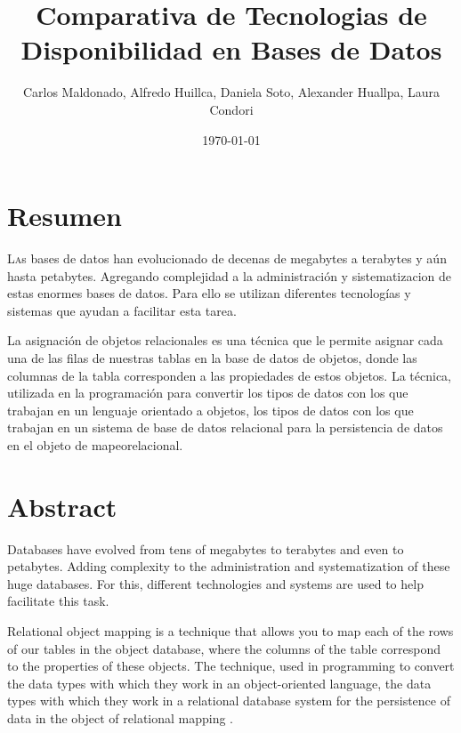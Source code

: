 \documentclass[twoside,twocolumn]{article}
\title{Comparativa de Tecnologias de Disponibilidad en Bases de Datos} %
\author{Carlos Maldonado, Alfredo Huillca, Daniela Soto, Alexander Huallpa, Laura Condori}
\date{\today} %
\begin{document}
\maketitle


\section{Resumen}

\lettrine[nindent=0em,lines=3] Las bases de 
datos han evolucionado de decenas de megabytes a
 terabytes y aún hasta petabytes. Agregando complejidad
  a la administración y sistematizacion de estas enormes 
  bases de datos. Para ello se utilizan diferentes tecnologías 
  y sistemas que ayudan a facilitar esta tarea. 

La asignación de objetos relacionales es una técnica que le 
permite asignar cada una de las filas de nuestras tablas en la
 base de datos de objetos, donde las columnas de la tabla corresponden 
 a las propiedades de estos objetos. La técnica, utilizada en la
  programación para convertir los tipos de datos con los que trabajan
   en un lenguaje orientado a objetos, los tipos de datos con los que 
   trabajan en un sistema de base de datos relacional para la persistencia
    de datos en el objeto de mapeorelacional. 




\section{Abstract}


Databases have evolved from tens of megabytes to 
terabytes and even to petabytes. Adding complexity to 
the administration and systematization of these huge databases.
 For this, different technologies and systems are used to help 
 facilitate this task.

Relational object mapping is a technique that allows 
you to map each of the rows of our tables in the object database,
 where the columns of the table correspond to the properties of these
  objects. The technique, used in programming to convert the data types 
  with which they work in an object-oriented language, the data types with
   which they work in a relational database system for the persistence of 
   data in the object of relational mapping .
\end{document}
